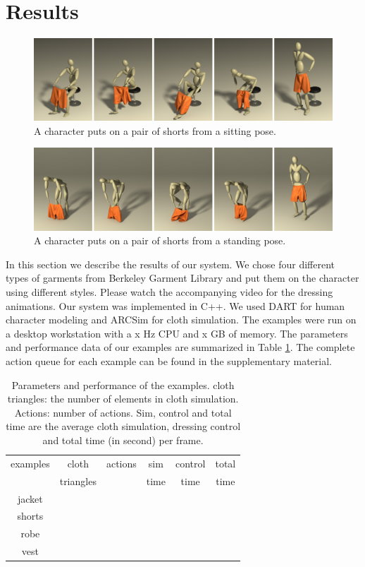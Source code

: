 \section{Results}

\begin{figure}[!t]
  \centering
  \includegraphics[width=\textwidth]{images/shortsSitting}
  \caption{A character puts on a pair of shorts from a sitting pose.}
  \label{fig:shorts1}
\end{figure}

\begin{figure}[!t]
  \centering
  \includegraphics[width=\textwidth]{images/shortsStanding}
  \caption{A character puts on a pair of shorts from a standing pose.}
  \label{fig:shorts2}
\end{figure}

In this section we describe the results of our system. We chose four different types of garments from Berkeley Garment Library \cite{}  and put them on the character using different styles. Please watch the accompanying video for the dressing animations. Our system was implemented in C++. We used DART \cite{} for human character modeling and ARCSim \cite{} for cloth simulation. The examples were run on a desktop workstation with a x Hz CPU and x GB of memory. The parameters and performance data of our examples are summarized in Table \ref{table:data}. The complete action queue for each example can be found in the supplementary material.

\begin{table}
  \centering
  \begin{tabular}{|c|c|c|c|c|c|}
    \hline
    examples & cloth & actions & sim & control  & total \\
    & triangles &  & time & time & time \\
    \hline
    jacket &   &  &  &  &   \\
    shorts & &  & & & \\
    robe & & & & &   \\
    vest & & & & &   \\
    \hline
  \end{tabular}
  \caption{Parameters and performance of the examples. cloth triangles: the number of elements in cloth simulation. Actions: number of actions. Sim, control and total time are the average cloth simulation, dressing control and total time (in second) per frame.}
  \label{table:data}
\end{table}

